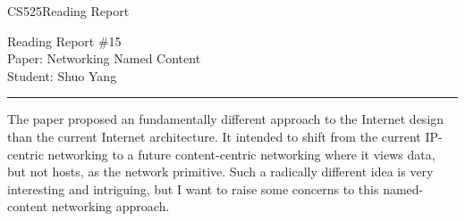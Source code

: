 \documentclass[11pt]{article}
\def\CourseCode{CS525}
\def\ReportNo{15}
\def\Category{Reading Report}
\def\PaperTitle{Networking Named Content}
\def\Author{Shuo Yang}
\begin{document}
\noindent

\CourseCode \hfill \Category

\begin{center}
Reading Report \#\ReportNo\\
Paper: \PaperTitle\\
Student: \Author\\
\end{center}

\hrule\smallskip
\vspace{1.5em}
The paper proposed an fundamentally different approach to the Internet
design than the current Internet architecture. It intended to shift
from the current IP-centric networking to a future content-centric
networking where it views data, but not hosts, as the network
primitive. Such a radically different idea is very interesting and
intriguing, but I want to raise some concerns to this named-content
networking approach.
\end{document}

